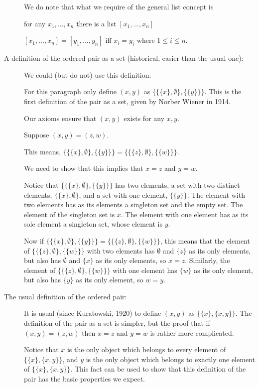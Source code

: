 \documentclass[12pt]{article}
\begin{document}
\begin{description}
We do note that what we require of the general list concept is

for any $x_1,\ldots,x_n$ there is a list $[x_1,\ldots,x_n]$

$[x_1,\ldots,x_n] = [y_1,\ldots,y_n]$ iff $x_i = y_i$ where $1 \leq i \leq n$.

\item[A definition of the ordered pair as a set (historical, easier than the usual one):]

We could (but do not) use this definition:

For this paragraph only define $(x,y)$ as $\{\{\{x\},\emptyset\},\{\{y\}\}\}$.  This is the first definition of the pair as a set, given by Norber Wiener in 1914.

Our axioms ensure that $(x,y)$ exists for any $x,y$.

Suppose $(x,y)=(z,w)$.

This means, $\{\{\{x\},\emptyset\},\{\{y\}\}\}=\{\{\{z\},\emptyset\},\{\{w\}\}\}$.

We need to show that this implies that $x=z$ and $y=w$.

Notice that $\{\{\{x\},\emptyset\},\{\{y\}\}\}$ has two elements, a set with two distinct elements,
$\{\{x\},\emptyset\}$, and a set with one element, $\{\{y\}\}$.  The element with two elements has as its elements
a singleton set and the empty set.  The element of the singleton set is $x$.   The element with one element has
as its sole element a singleton set, whose element is $y$.

Now if $\{\{\{x\},\emptyset\},\{\{y\}\}\}=\{\{\{z\},\emptyset\},\{\{w\}\}\}$, this means that the element of 
$\{\{\{z\},\emptyset\},\{\{w\}\}\}$ with two elements has $\emptyset$ and $\{z\}$ as its only elements,
but also has $\emptyset$ and $\{x\}$ as its only elements, so $x=z$.  Similarly, the element of $\{\{\{z\},\emptyset\},\{\{w\}\}\}$ with one element has $\{w\}$ as its only element, but also has $\{y\}$ as its only element, so $w=y$.

\item[The usual definition of the ordered pair:]

It is usual (since Kuratowski, 1920) to define $(x,y)$ as $\{\{x\},\{x,y\}\}$.  The definition of the pair as a set is simpler,
but the proof that if $(x,y)=(z,w)$ then $x=z$ and $y=w$ is rather more complicated.

Notice that $x$ is the only object which belongs to every element of $\{\{x\},\{x,y\}\}$, and $y$ is the only object which belongs to exactly one element of $\{\{x\},\{x,y\}\}$.  This fact can be used to show that this definition of the pair has the basic properties we expect.


\end{description}
\end{document}
